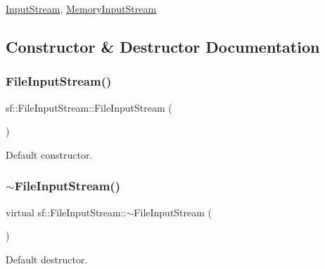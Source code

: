 \mbox{\hyperlink{classsf_1_1_input_stream}{Input\+Stream}}, \mbox{\hyperlink{classsf_1_1_memory_input_stream}{Memory\+Input\+Stream}} \begin{DoxyVerb}\end{DoxyVerb}
 

\subsection{Constructor \& Destructor Documentation}
\mbox{\label{classsf_1_1_file_input_stream_a9a321e273f41ff7f187899061fcae9be}} 
\subsubsection{\texorpdfstring{FileInputStream()}{FileInputStream()}}
{\footnotesize\ttfamily sf\+::\+File\+Input\+Stream\+::\+File\+Input\+Stream (\begin{DoxyParamCaption}{ }\end{DoxyParamCaption})}



Default constructor. 

\begin{DoxyVerb}\end{DoxyVerb}
 \mbox{\label{classsf_1_1_file_input_stream_ad49ae2025ff2183f80067943a7d0276d}} 
\subsubsection{\texorpdfstring{$\sim$FileInputStream()}{~FileInputStream()}}
{\footnotesize\ttfamily virtual sf\+::\+File\+Input\+Stream\+::$\sim$\+File\+Input\+Stream (\begin{DoxyParamCaption}{ }\end{DoxyParamCaption})\hspace{0.3cm}{\ttfamily [virtual]}}



Default destructor. 

\begin{DoxyVerb}\end{DoxyVerb}
 

